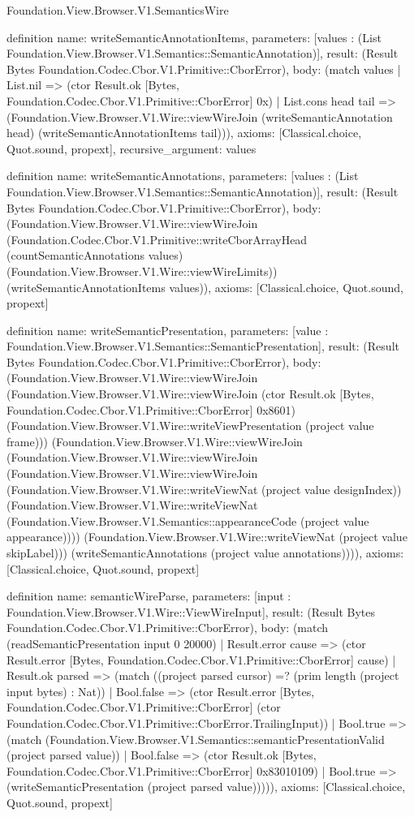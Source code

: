 \begin{lexlean}{Foundation.View.Browser.V1.SemanticsWire}
\begin{semanticmodule}
definition{
  name: writeSemanticAnnotationItems,
  parameters: [values : (List Foundation.View.Browser.V1.Semantics::SemanticAnnotation)],
  result: (Result Bytes Foundation.Codec.Cbor.V1.Primitive::CborError),
  body: (match values
    | List.nil => (ctor Result.ok [Bytes, Foundation.Codec.Cbor.V1.Primitive::CborError] 0x)
    | List.cons head tail => (Foundation.View.Browser.V1.Wire::viewWireJoin (writeSemanticAnnotation head) (writeSemanticAnnotationItems tail))),
  axioms: [Classical.choice, Quot.sound, propext],
  recursive_argument: values
}

definition{
  name: writeSemanticAnnotations,
  parameters: [values : (List Foundation.View.Browser.V1.Semantics::SemanticAnnotation)],
  result: (Result Bytes Foundation.Codec.Cbor.V1.Primitive::CborError),
  body: (Foundation.View.Browser.V1.Wire::viewWireJoin (Foundation.Codec.Cbor.V1.Primitive::writeCborArrayHead (countSemanticAnnotations values) (Foundation.View.Browser.V1.Wire::viewWireLimits)) (writeSemanticAnnotationItems values)),
  axioms: [Classical.choice, Quot.sound, propext]
}

definition{
  name: writeSemanticPresentation,
  parameters: [value : Foundation.View.Browser.V1.Semantics::SemanticPresentation],
  result: (Result Bytes Foundation.Codec.Cbor.V1.Primitive::CborError),
  body: (Foundation.View.Browser.V1.Wire::viewWireJoin (Foundation.View.Browser.V1.Wire::viewWireJoin (ctor Result.ok [Bytes, Foundation.Codec.Cbor.V1.Primitive::CborError] 0x8601) (Foundation.View.Browser.V1.Wire::writeViewPresentation (project value frame))) (Foundation.View.Browser.V1.Wire::viewWireJoin (Foundation.View.Browser.V1.Wire::viewWireJoin (Foundation.View.Browser.V1.Wire::viewWireJoin (Foundation.View.Browser.V1.Wire::writeViewNat (project value designIndex)) (Foundation.View.Browser.V1.Wire::writeViewNat (Foundation.View.Browser.V1.Semantics::appearanceCode (project value appearance)))) (Foundation.View.Browser.V1.Wire::writeViewNat (project value skipLabel))) (writeSemanticAnnotations (project value annotations)))),
  axioms: [Classical.choice, Quot.sound, propext]
}

definition{
  name: semanticWireParse,
  parameters: [input : Foundation.View.Browser.V1.Wire::ViewWireInput],
  result: (Result Bytes Foundation.Codec.Cbor.V1.Primitive::CborError),
  body: (match (readSemanticPresentation input 0 20000)
    | Result.error cause => (ctor Result.error [Bytes, Foundation.Codec.Cbor.V1.Primitive::CborError] cause)
    | Result.ok parsed => (match ((project parsed cursor) =? (prim length (project input bytes) : Nat))
      | Bool.false => (ctor Result.error [Bytes, Foundation.Codec.Cbor.V1.Primitive::CborError] (ctor Foundation.Codec.Cbor.V1.Primitive::CborError.TrailingInput))
      | Bool.true => (match (Foundation.View.Browser.V1.Semantics::semanticPresentationValid (project parsed value))
        | Bool.false => (ctor Result.ok [Bytes, Foundation.Codec.Cbor.V1.Primitive::CborError] 0x83010109)
        | Bool.true => (writeSemanticPresentation (project parsed value))))),
  axioms: [Classical.choice, Quot.sound, propext]
}


\end{semanticmodule}
\end{lexlean}
